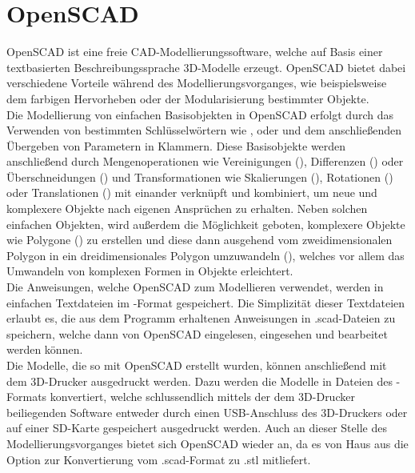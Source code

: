 \section{OpenSCAD}
OpenSCAD ist eine freie CAD-Modellierungssoftware, welche auf Basis einer textbasierten Beschreibungssprache 3D-Modelle erzeugt.
OpenSCAD bietet dabei verschiedene Vorteile während des Modellierungsvorganges, wie beispielsweise dem farbigen Hervorheben oder der Modularisierung bestimmter Objekte. \\
Die Modellierung von einfachen Basisobjekten in OpenSCAD erfolgt durch das Verwenden von bestimmten Schlüsselwörtern wie ,  oder  und dem anschließenden Übergeben von Parametern in Klammern.
Diese Basisobjekte werden anschließend durch Mengenoperationen wie Vereinigungen (), Differenzen () oder Überschneidungen () und Transformationen wie Skalierungen (), Rotationen () oder Translationen () mit einander verknüpft und kombiniert, um neue und komplexere Objekte nach eigenen Ansprüchen zu erhalten.
Neben solchen einfachen Objekten, wird außerdem die Möglichkeit geboten, komplexere Objekte wie Polygone () zu erstellen und diese dann ausgehend vom zweidimensionalen Polygon in ein dreidimensionales Polygon umzuwandeln (), welches vor allem das Umwandeln von komplexen Formen in Objekte erleichtert. \\
Die Anweisungen, welche OpenSCAD zum Modellieren verwendet, werden in einfachen Textdateien im -Format gespeichert.
Die Simplizität dieser Textdateien erlaubt es, die aus dem Programm erhaltenen Anweisungen in .scad-Dateien zu speichern, welche dann von OpenSCAD eingelesen, eingesehen und bearbeitet werden können. \\
Die Modelle, die so mit OpenSCAD erstellt wurden, können anschließend mit dem 3D-Drucker ausgedruckt werden.
Dazu werden die Modelle in Dateien des -Formats konvertiert, welche schlussendlich mittels der dem 3D-Drucker beiliegenden Software entweder durch einen USB-Anschluss des 3D-Druckers oder auf einer SD-Karte gespeichert ausgedruckt werden.
Auch an dieser Stelle des Modellierungsvorganges bietet sich OpenSCAD wieder an, da es von Haus aus die Option zur Konvertierung vom .scad-Format zu .stl mitliefert.
